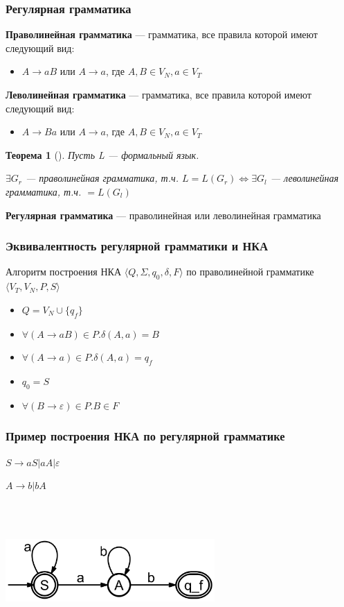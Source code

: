 \documentclass{beamer}
\newtheorem{rutheorem}{Теорема}
\begin{document}
\begin{frame}[fragile]
  \transwipe[direction=90]
  \frametitle{Регулярная грамматика}
  \textbf{Праволинейная грамматика} --- грамматика, все правила которой имеют следующий вид:
  \begin{itemize}
    \item $A \rightarrow a B$ или $A \rightarrow a$, где $A, B \in V_N, a \in V_T$
  \end{itemize}


  \textbf{Леволинейная грамматика} --- грамматика, все правила которой имеют следующий вид:
  \begin{itemize}
    \item $A \rightarrow B a$ или $A \rightarrow a$, где $A, B \in V_N, a \in V_T$
  \end{itemize}

\pause 

  \begin{rutheorem}[]
    Пусть L --- формальный язык. 

    $\exists G_r$ --- праволинейная грамматика, т.ч. $L = L(G_r) \Leftrightarrow \exists G_l$ --- леволинейная грамматика, т.ч. $ = L(G_l) $
  \end{rutheorem}
\pause
  \textbf{Регулярная грамматика} --- праволинейная или леволинейная грамматика
\end{frame}



\begin{frame}[fragile]
  \transwipe[direction=90]
  \frametitle{Эквивалентность регулярной грамматики и НКА}
  Алгоритм построения НКА $\langle Q, \Sigma, q_0, \delta, F \rangle$ по праволинейной грамматике $\langle V_T, V_N, P, S \rangle$
  \begin{itemize}
    \item $Q = V_N \cup \{q_f\}$
    \item $\forall (A \rightarrow a B) \in P. \delta (A, a) = B$
    \item $\forall (A \rightarrow a) \in P. \delta (A, a) = q_f$
    \item $q_0 = S$
    \item $\forall (B \rightarrow \varepsilon) \in P. B \in F$
  \end{itemize}
\end{frame}


\begin{frame}[fragile]
  \transwipe[direction=90]
  \frametitle{Пример построения НКА по регулярной грамматике}
  $S \rightarrow aS | aA | \varepsilon$
  
  $A \rightarrow b | bA$
  
  ~\\~
  \begin{center}
  \includegraphics[width=0.60\textwidth]{pics/nfa_rg.png} 
  \end{center}
\end{frame}
\end{document}
